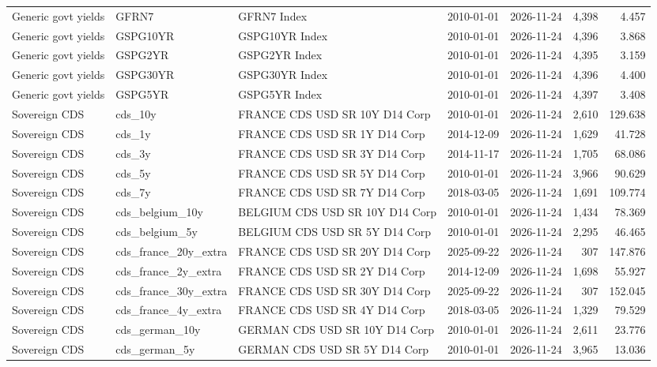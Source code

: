 \documentclass[10pt,a4paper]{article}
\begin{document}
{\begin{longtable}{lllllrr}
Generic govt yields & GFRN7 & GFRN7 Index & 2010-01-01 & 2026-11-24 & 4,398 & 4.457 \\
Generic govt yields & GSPG10YR & GSPG10YR Index & 2010-01-01 & 2026-11-24 & 4,396 & 3.868 \\
Generic govt yields & GSPG2YR & GSPG2YR Index & 2010-01-01 & 2026-11-24 & 4,395 & 3.159 \\
Generic govt yields & GSPG30YR & GSPG30YR Index & 2010-01-01 & 2026-11-24 & 4,396 & 4.400 \\
Generic govt yields & GSPG5YR & GSPG5YR Index & 2010-01-01 & 2026-11-24 & 4,397 & 3.408 \\
Sovereign CDS & cds\_10y & FRANCE CDS USD SR 10Y D14 Corp & 2010-01-01 & 2026-11-24 & 2,610 & 129.638 \\
Sovereign CDS & cds\_1y & FRANCE CDS USD SR 1Y D14 Corp & 2014-12-09 & 2026-11-24 & 1,629 & 41.728 \\
Sovereign CDS & cds\_3y & FRANCE CDS USD SR 3Y D14 Corp & 2014-11-17 & 2026-11-24 & 1,705 & 68.086 \\
Sovereign CDS & cds\_5y & FRANCE CDS USD SR 5Y D14 Corp & 2010-01-01 & 2026-11-24 & 3,966 & 90.629 \\
Sovereign CDS & cds\_7y & FRANCE CDS USD SR 7Y D14 Corp & 2018-03-05 & 2026-11-24 & 1,691 & 109.774 \\
Sovereign CDS & cds\_belgium\_10y & BELGIUM CDS USD SR 10Y D14 Corp & 2010-01-01 & 2026-11-24 & 1,434 & 78.369 \\
Sovereign CDS & cds\_belgium\_5y & BELGIUM CDS USD SR 5Y D14 Corp & 2010-01-01 & 2026-11-24 & 2,295 & 46.465 \\
Sovereign CDS & cds\_france\_20y\_extra & FRANCE CDS USD SR 20Y D14 Corp & 2025-09-22 & 2026-11-24 & 307 & 147.876 \\
Sovereign CDS & cds\_france\_2y\_extra & FRANCE CDS USD SR 2Y D14 Corp & 2014-12-09 & 2026-11-24 & 1,698 & 55.927 \\
Sovereign CDS & cds\_france\_30y\_extra & FRANCE CDS USD SR 30Y D14 Corp & 2025-09-22 & 2026-11-24 & 307 & 152.045 \\
Sovereign CDS & cds\_france\_4y\_extra & FRANCE CDS USD SR 4Y D14 Corp & 2018-03-05 & 2026-11-24 & 1,329 & 79.529 \\
Sovereign CDS & cds\_german\_10y & GERMAN CDS USD SR 10Y D14 Corp & 2010-01-01 & 2026-11-24 & 2,611 & 23.776 \\
Sovereign CDS & cds\_german\_5y & GERMAN CDS USD SR 5Y D14 Corp & 2010-01-01 & 2026-11-24 & 3,965 & 13.036 \\

\end{longtable}}
\end{document}

